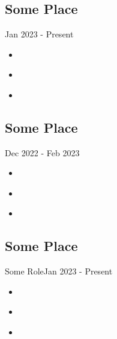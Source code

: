 \section{}
\subsection{Some Place}{Jan 2023 - Present}
\begin{itemize}
    \item \lipsum[2][2] \textbf{\lipsum[4][1]}
    \item \lipsum[3][1] \textbf{\lipsum[1][1]}
    \item \textbf{\lipsum[2][2]} \lipsum[4][1]
\end{itemize}

\subsection{Some Place}{Dec 2022 - Feb 2023}
\begin{itemize}
    \item \lipsum[2][2] \textbf{\lipsum[4][1]}
    \item \lipsum[3][1] \textbf{\lipsum[1][1]}
    \item \textbf{\lipsum[2][2]} \lipsum[4][1]
\end{itemize}

\subsection{Some Place}{Some Role}{Jan 2023 - Present}
\begin{itemize}
    \item \lipsum[2][2] \textbf{\lipsum[4][1]}
    \item \lipsum[3][1] \textbf{\lipsum[1][1]}
    \item \textbf{\lipsum[2][2]} \lipsum[4][1]
\end{itemize}